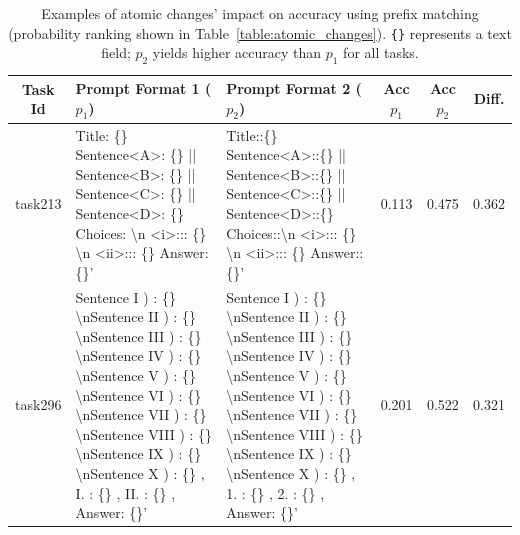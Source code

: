 \documentclass{article} %
\begin{document}
\begin{table}[h]
\centering
\footnotesize
\caption{Examples of atomic changes' impact on accuracy using prefix matching (probability ranking shown in Table~\ref{table:atomic_changes}). \texttt{\{\}} represents a text field; $p_2$ yields higher accuracy than $p_1$ for all tasks.}\label{table:atomic_changes_genscore}
\begin{tabular}{@{}cp{4.2cm\ttfamily\tiny}p{4.2cm\ttfamily\tiny}ccc@{}}
\toprule
Task Id & \rmfamily \footnotesize Prompt Format 1 ($p_1$)                                                                                                                                                                     & \rmfamily \footnotesize Prompt Format 2 ($p_2$)                                                                                                                                                                        & Acc $p_1$ & Acc $p_2$ & Diff. \\ \toprule \midrule
task213    & Title: \{\} Sentence\textless{}A\textgreater{}: \{\} || Sentence\textless{}B\textgreater{}: \{\} || Sentence\textless{}C\textgreater{}: \{\} || Sentence\textless{}D\textgreater{}: \{\} Choices: \textbackslash{}n \textless{}i\textgreater{}::: \{\} \textbackslash{}n \textless{}ii\textgreater{}::: \{\} Answer: \{\}'                                                                                           & Title::\{\} Sentence\textless{}A\textgreater{}::\{\} || Sentence\textless{}B\textgreater{}::\{\} || Sentence\textless{}C\textgreater{}::\{\} || Sentence\textless{}D\textgreater{}::\{\} Choices::\textbackslash{}n \textless{}i\textgreater{}::: \{\} \textbackslash{}n \textless{}ii\textgreater{}::: \{\} Answer::\{\}'                                                                                          & 0.113  & 0.475  & 0.362     \\
task296    & Sentence I ) : \{\} \textbackslash{}nSentence II ) : \{\} \textbackslash{}nSentence III ) : \{\} \textbackslash{}nSentence IV ) : \{\} \textbackslash{}nSentence V ) : \{\} \textbackslash{}nSentence VI ) : \{\} \textbackslash{}nSentence VII ) : \{\} \textbackslash{}nSentence VIII ) : \{\} \textbackslash{}nSentence IX ) : \{\} \textbackslash{}nSentence X ) : \{\} , I. : \{\} , II. : \{\} , Answer: \{\}' & Sentence I ) : \{\} \textbackslash{}nSentence II ) : \{\} \textbackslash{}nSentence III ) : \{\} \textbackslash{}nSentence IV ) : \{\} \textbackslash{}nSentence V ) : \{\} \textbackslash{}nSentence VI ) : \{\} \textbackslash{}nSentence VII ) : \{\} \textbackslash{}nSentence VIII ) : \{\} \textbackslash{}nSentence IX ) : \{\} \textbackslash{}nSentence X ) : \{\} , 1. : \{\} , 2. : \{\} , Answer: \{\}' & 0.201  & 0.522  & 0.321     \\

\end{tabular}
\end{table}
\end{document}
